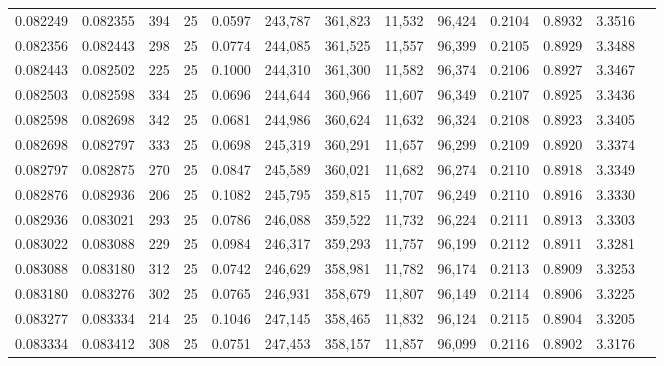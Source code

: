 \begin{tabular}{rrrrrrrrrrrrr}
0.082249 & 0.082355 &   394 &  25 &                                     0.0597 & 243,787 & 361,823 &  11,532 &  96,424 & 0.2104 & 0.8932 & 3.3516 \\
0.082356 & 0.082443 &   298 &  25 &                                     0.0774 & 244,085 & 361,525 &  11,557 &  96,399 & 0.2105 & 0.8929 & 3.3488 \\
0.082443 & 0.082502 &   225 &  25 &                                     0.1000 & 244,310 & 361,300 &  11,582 &  96,374 & 0.2106 & 0.8927 & 3.3467 \\
0.082503 & 0.082598 &   334 &  25 &                                     0.0696 & 244,644 & 360,966 &  11,607 &  96,349 & 0.2107 & 0.8925 & 3.3436 \\
0.082598 & 0.082698 &   342 &  25 &                                     0.0681 & 244,986 & 360,624 &  11,632 &  96,324 & 0.2108 & 0.8923 & 3.3405 \\
0.082698 & 0.082797 &   333 &  25 &                                     0.0698 & 245,319 & 360,291 &  11,657 &  96,299 & 0.2109 & 0.8920 & 3.3374 \\
0.082797 & 0.082875 &   270 &  25 &                                     0.0847 & 245,589 & 360,021 &  11,682 &  96,274 & 0.2110 & 0.8918 & 3.3349 \\
0.082876 & 0.082936 &   206 &  25 &                                     0.1082 & 245,795 & 359,815 &  11,707 &  96,249 & 0.2110 & 0.8916 & 3.3330 \\
0.082936 & 0.083021 &   293 &  25 &                                     0.0786 & 246,088 & 359,522 &  11,732 &  96,224 & 0.2111 & 0.8913 & 3.3303 \\
0.083022 & 0.083088 &   229 &  25 &                                     0.0984 & 246,317 & 359,293 &  11,757 &  96,199 & 0.2112 & 0.8911 & 3.3281 \\
0.083088 & 0.083180 &   312 &  25 &                                     0.0742 & 246,629 & 358,981 &  11,782 &  96,174 & 0.2113 & 0.8909 & 3.3253 \\
0.083180 & 0.083276 &   302 &  25 &                                     0.0765 & 246,931 & 358,679 &  11,807 &  96,149 & 0.2114 & 0.8906 & 3.3225 \\
0.083277 & 0.083334 &   214 &  25 &                                     0.1046 & 247,145 & 358,465 &  11,832 &  96,124 & 0.2115 & 0.8904 & 3.3205 \\
0.083334 & 0.083412 &   308 &  25 &                                     0.0751 & 247,453 & 358,157 &  11,857 &  96,099 & 0.2116 & 0.8902 & 3.3176 \\

\end{tabular}
